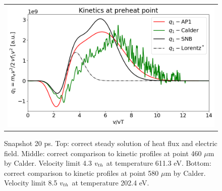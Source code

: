 \begin{figure}[htb]
\begin{center}
\begin{tabular}{c}
	  \includegraphics[width=\figscale\textwidth]{../VFPdata/C7_Calder_case5_nonlocal_kinetics.png} 
    \end{tabular}
  \caption{  
  Snapshot 20 ps. Top: correct steady solution of heat flux and electric field. 
  Middle: correct comparison to kinetic profiles at point 460 $\mu$m by Calder. 
  Velocity limit 4.3 $v_{th}$ at temperature 611.3 eV.
  Bottom: correct comparison to kinetic profiles at point 580 $\mu$m by Calder.
  Velocity limit 8.5 $v_{th}$ at temperature 202.4 eV.
  }
  \label{fig:C7_Calder_case5}
  \end{center} 
\end{figure}

